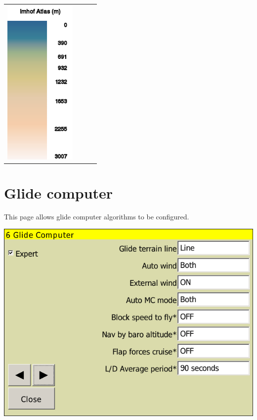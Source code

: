 \begin{maxipage}
\begin{longtable}{c c c c}
\includegraphics[angle=0,width=3.5cm,keepaspectratio='true']{figures/ramp-terrain-imhofatlas.png}
\\
\end{longtable}
\end{maxipage}


\clearpage
\section{Glide computer}\label{sec:final-glide}

This page allows glide computer algorithms to be configured.

\begin{center}
\includegraphics[angle=0,width=0.8\linewidth,keepaspectratio='true']{figures/config-glidecomputer.png}
\end{center}

